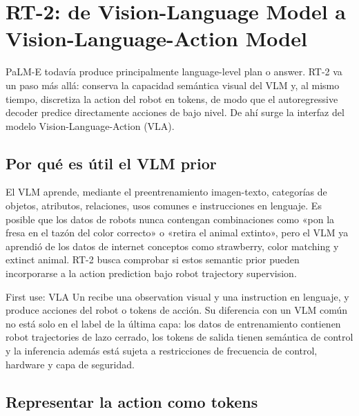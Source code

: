 \section{RT-2: de Vision-Language Model a Vision-Language-Action Model}

PaLM-E todavía produce principalmente language-level plan o answer. RT-2 va un paso más allá: conserva la capacidad semántica visual del VLM y, al mismo tiempo, discretiza la action del robot en tokens, de modo que el autoregressive decoder predice directamente acciones de bajo nivel. De ahí surge la interfaz del modelo Vision-Language-Action (VLA).

\subsection{Por qué es útil el VLM prior}

El VLM aprende, mediante el preentrenamiento imagen-texto, categorías de objetos, atributos, relaciones, usos comunes e instrucciones en lenguaje. Es posible que los datos de robots nunca contengan combinaciones como «pon la fresa en el tazón del color correcto» o «retira el animal extinto», pero el VLM ya aprendió de los datos de internet conceptos como strawberry, color matching y extinct animal. RT-2 busca comprobar si estos semantic prior pueden incorporarse a la action prediction bajo robot trajectory supervision.



\begin{knowledgebox}{First use: VLA}
Un  recibe una observation visual y una instruction en lenguaje, y produce acciones del robot o tokens de acción. Su diferencia con un VLM común no está solo en el label de la última capa: los datos de entrenamiento contienen robot trajectories de lazo cerrado, los tokens de salida tienen semántica de control y la inferencia además está sujeta a restricciones de frecuencia de control, hardware y capa de seguridad.
\end{knowledgebox}

\subsection{Representar la action como tokens}

